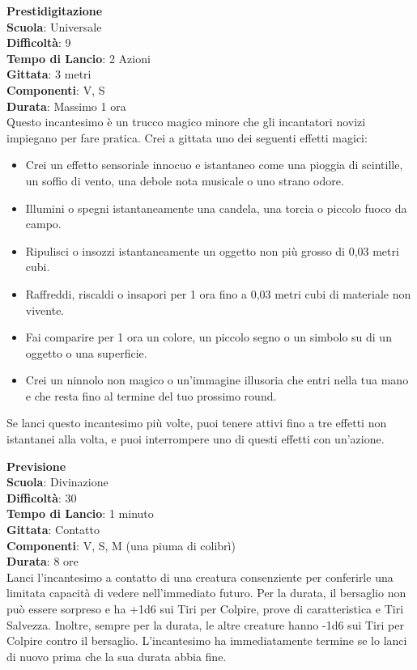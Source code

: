 \begin{multicols}{2}
\medskip\textbf{Prestidigitazione}\\
\textbf{Scuola}: Universale\\
\textbf{Difficoltà}: 9\\
\textbf{Tempo di Lancio}: 2 Azioni\\
\textbf{Gittata}: 3 metri\\
\textbf{Componenti}: V, S\\
\textbf{Durata}: Massimo 1 ora\\
Questo incantesimo è un trucco magico minore che gli incantatori novizi impiegano per fare pratica. Crei a gittata uno dei seguenti effetti magici:
\medskip
\begin{itemize}
\item
Crei un effetto sensoriale innocuo e istantaneo come una pioggia di scintille, un soffio di vento, una debole nota musicale o uno strano odore.
\item
Illumini o spegni istantaneamente una candela, una torcia o piccolo fuoco da campo.
\item
Ripulisci o insozzi istantaneamente un oggetto non più grosso di 0,03 metri cubi.
\item
Raffreddi, riscaldi o insapori per 1 ora fino a 0,03 metri cubi di materiale non vivente.
\item
Fai comparire per 1 ora un colore, un piccolo segno o un simbolo su di un oggetto o una superficie.
\item
Crei un ninnolo non magico o un'immagine illusoria che entri nella tua mano e che resta fino al termine del tuo prossimo round.
\end{itemize}
\medskip
Se lanci questo incantesimo più volte, puoi tenere attivi fino a tre effetti non istantanei alla volta, e puoi interrompere uno di questi effetti con un'azione.

\medskip\textbf{Previsione}\\
\textbf{Scuola}: Divinazione\\
\textbf{Difficoltà}: 30\\
\textbf{Tempo di Lancio}: 1 minuto\\
\textbf{Gittata}: Contatto\\
\textbf{Componenti}: V, S, M (una piuma di colibrì)\\
\textbf{Durata}: 8 ore\\
Lanci l'incantesimo a contatto di una creatura consenziente per conferirle una limitata capacità di vedere nell'immediato futuro. Per la durata, il bersaglio non può essere sorpreso e ha +1d6 sui Tiri per Colpire, prove di caratteristica e Tiri Salvezza. Inoltre, sempre per la durata, le altre creature hanno -1d6 sui Tiri per Colpire contro il bersaglio. L'incantesimo ha immediatamente termine se lo lanci di nuovo prima che la sua durata abbia fine.


\end{multicols}

